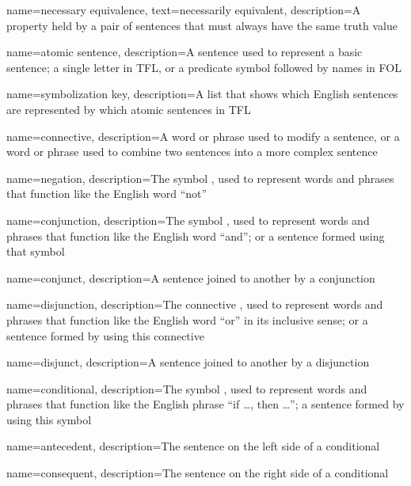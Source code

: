 {
name={necessary equivalence},
text={necessarily equivalent},
description={A property held by a pair of sentences that must always have the same truth value}
}



{
name={atomic sentence},
description={A sentence used to represent a basic sentence; a single letter in TFL, or a predicate symbol followed by names in FOL}
}

{
name={symbolization key},
description={A list that shows which English sentences are represented by which \glspl{atomic sentence} in TFL}
}


{
name=connective,
description={A word or phrase used to modify a sentence, or a word or phrase used to combine two sentences into a more complex sentence} 
}

{
name=negation,
description={The symbol \enot, used to represent words and phrases that function like the English word ``not''}
}

{
name=conjunction,
description={The symbol \eand, used to represent words and phrases that function like the English word ``and''; or a sentence formed using that symbol}
}

{
name=conjunct,
description={A sentence joined to another by a \gls{conjunction}}
}

{
name=disjunction,
description={The connective \eor, used to represent words and phrases that function like the English word ``or'' in its inclusive sense; or a sentence formed by using this connective}
}

{
name=disjunct,
description={A sentence joined to another by a \gls{disjunction}}
}

{
name={conditional},
description={The symbol \eif, used to represent words and phrases that function like the English phrase ``if \dots, then \dots''; a sentence formed by using this symbol}
}

{
name=antecedent,
description={The sentence on the left side of a \gls{conditional}}
}

{
name=consequent,
description={The sentence on the right side of a \gls{conditional}}
}


